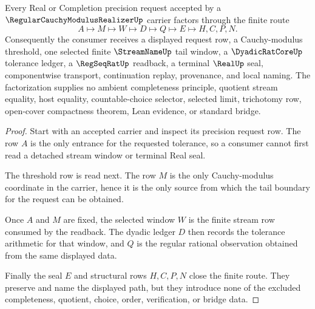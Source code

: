 \begin{theorem}
\label{thm:regular-cauchy-modulus-realizer-tail-realization}
Every Real or Completion precision request accepted by a $\RegularCauchyModulusRealizerUp$ carrier factors through the finite route
$$
A\longmapsto M\longmapsto W\longmapsto D\longmapsto Q\longmapsto E\longmapsto H,C,P,N .
$$
Consequently the consumer receives a displayed request row, a Cauchy-modulus threshold, one selected finite $\StreamNameUp$ tail window, a $\DyadicRatCoreUp$ tolerance ledger, a $\RegSeqRatUp$ readback, a terminal $\RealUp$ seal, componentwise transport, continuation replay, provenance, and local naming. The factorization supplies no ambient completeness principle, quotient stream equality, host equality, countable-choice selector, selected limit, trichotomy row, open-cover compactness theorem, Lean evidence, or standard bridge.
\end{theorem}
\begin{proof}
Start with an accepted carrier and inspect its precision request row. The row $A$ is the only entrance for the requested tolerance, so a consumer cannot first read a detached stream window or terminal Real seal.

The threshold row is read next. The row $M$ is the only Cauchy-modulus coordinate in the carrier, hence it is the only source from which the tail boundary for the request can be obtained.

Once $A$ and $M$ are fixed, the selected window $W$ is the finite stream row consumed by the readback. The dyadic ledger $D$ then records the tolerance arithmetic for that window, and $Q$ is the regular rational observation obtained from the same displayed data.

Finally the seal $E$ and structural rows $H,C,P,N$ close the finite route. They preserve and name the displayed path, but they introduce none of the excluded completeness, quotient, choice, order, verification, or bridge data.
\end{proof}


